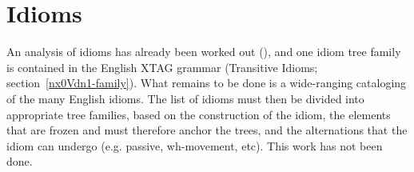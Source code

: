 \section{Idioms}

An analysis of idioms has already been worked out (\cite{AS89}), and one idiom
tree family is contained in the English XTAG grammar (Transitive Idioms;
section~\ref{nx0Vdn1-family}).  What remains to be done is a wide-ranging
cataloging of the many English idioms.  The list of idioms must then be divided
into appropriate tree families, based on the construction of the idiom, the
elements that are frozen and must therefore anchor the trees, and the
alternations that the idiom can undergo (e.g. passive, wh-movement, etc).  This
work has not been done.
